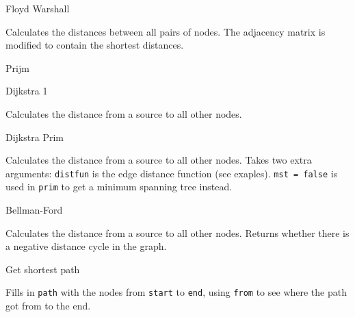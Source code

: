 \begin{algorithm}{Floyd Warshall}

Calculates the distances between all pairs of nodes.
The adjacency matrix is modified to contain the shortest distances.
\end{algorithm}

\begin{algorithm}{Prijm}
\end{algorithm}

\begin{algorithm}{Dijkstra 1}

Calculates the distance from a source to all other nodes.
\end{algorithm}

\begin{algorithm}{Dijkstra Prim}

Calculates the distance from a source to all other nodes.
Takes two extra arguments:
{\tt distfun} is the edge distance function (see exaples).
{\tt mst = false} is used in {\tt prim} to get a
minimum spanning tree instead.
\end{algorithm}

\begin{algorithm}{Bellman-Ford}

Calculates the distance from a source to all other nodes.
Returns whether there is a negative distance cycle in the graph.
\end{algorithm}

\begin{algorithm}{Get shortest path}

Fills in {\tt path} with the nodes from {\tt start} to {\tt end}, using
{\tt from} to see where the path got from to the end.
\end{algorithm}
